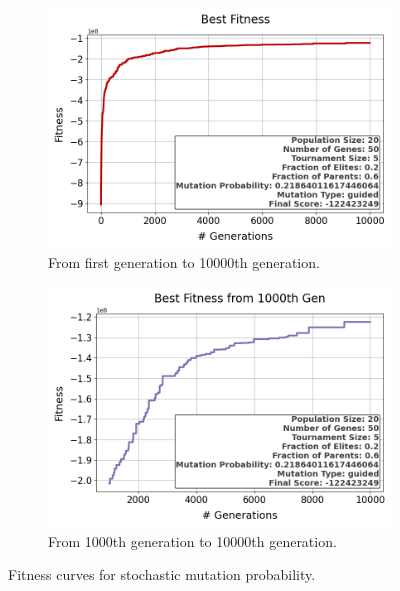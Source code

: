 \documentclass{assignment}
\begin{document}
\begin{figure}[H]
    \begin{subfigure}{0.5\textwidth}
        \includegraphics[width=\textwidth]{figures/best_fitness_outputSTOC_20_50_5_0.2_0.6_0.21864011617446064_guided.png}
        \caption{From first generation to 10000th generation.}
    \end{subfigure}\hfill
    \begin{subfigure}{0.5\textwidth}
        \includegraphics[width=\textwidth]{figures/best_fitness_1000_outputSTOC_20_50_5_0.2_0.6_0.21864011617446064_guided.png}
        \caption{From 1000th generation to 10000th generation.}
    \end{subfigure}
    \caption{Fitness curves for stochastic mutation probability.}
\label{fig:stochastic_mutation}
\end{figure}
\end{document}

